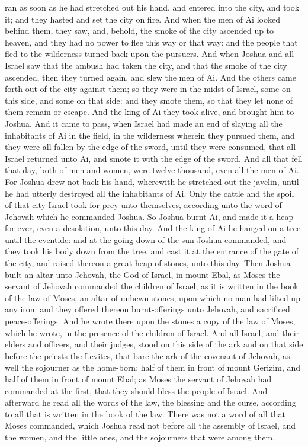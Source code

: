 ran as soon as he had stretched out his hand, and entered into the city, and took it; and they hasted and set the city on fire. And when the men of Ai looked behind them, they saw, and, behold, the smoke of the city ascended up to heaven, and they had no power to flee this way or that way: and the people that fled to the wilderness turned back upon the pursuers. And when Joshua and all Israel saw that the ambush had taken the city, and that the smoke of the city ascended, then they turned again, and slew the men of Ai. And the others came forth out of the city against them; so they were in the midst of Israel, some on this side, and some on that side: and they smote them, so that they let none of them remain or escape. And the king of Ai they took alive, and brought him to Joshua.  And it came to pass, when Israel had made an end of slaying all the inhabitants of Ai in the field, in the wilderness wherein they pursued them, and they were all fallen by the edge of the sword, until they were consumed, that all Israel returned unto Ai, and smote it with the edge of the sword. And all that fell that day, both of men and women, were twelve thousand, even all the men of Ai. For Joshua drew not back his hand, wherewith he stretched out the javelin, until he had utterly destroyed all the inhabitants of Ai. Only the cattle and the spoil of that city Israel took for prey unto themselves, according unto the word of Jehovah which he commanded Joshua. So Joshua burnt Ai, and made it a heap for ever, even a desolation, unto this day. And the king of Ai he hanged on a tree until the eventide: and at the going down of the sun Joshua commanded, and they took his body down from the tree, and cast it at the entrance of the gate of the city, and raised thereon a great heap of stones, unto this day.  Then Joshua built an altar unto Jehovah, the God of Israel, in mount Ebal, as Moses the servant of Jehovah commanded the children of Israel, as it is written in the book of the law of Moses, an altar of unhewn stones, upon which no man had lifted up any iron: and they offered thereon burnt-offerings unto Jehovah, and sacrificed peace-offerings. And he wrote there upon the stones a copy of the law of Moses, which he wrote, in the presence of the children of Israel. And all Israel, and their elders and officers, and their judges, stood on this side of the ark and on that side before the priests the Levites, that bare the ark of the covenant of Jehovah, as well the sojourner as the home-born; half of them in front of mount Gerizim, and half of them in front of mount Ebal; as Moses the servant of Jehovah had commanded at the first, that they should bless the people of Israel. And afterward he read all the words of the law, the blessing and the curse, according to all that is written in the book of the law. There was not a word of all that Moses commanded, which Joshua read not before all the assembly of Israel, and the women, and the little ones, and the sojourners that were among them. 

